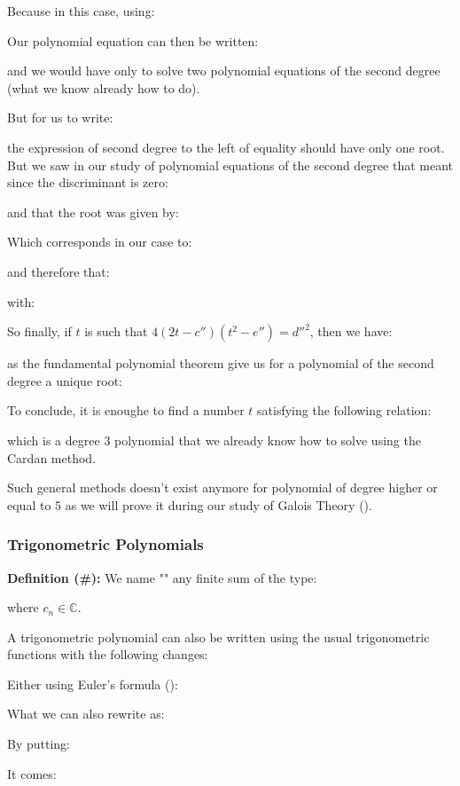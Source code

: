 	Because in this case, using:
	
	Our polynomial equation can then be written:
	
	and we would have only to solve two polynomial equations of the second degree (what we know already how to do).
	
	But for us to write:
	
	the expression of second degree to the left of equality should have only one root. But we saw in our study of polynomial equations of the second degree that meant since the discriminant is zero:
	
	and that the root was given by:
	
	Which corresponds in our case to:
	
	and therefore that:
	
	with:
	
	So finally, if $t$ is such that $4(2t-c'')(t^2-e'')={d''}^2$, then we have:
	
	as the fundamental polynomial theorem give us for a polynomial of the second degree a unique root:
	
	To conclude, it is enoughe to find a number $t$ satisfying the following relation:
	
	which is a degree $3$ polynomial that we already know how to solve using the Cardan method.

	Such general methods doesn't exist anymore for polynomial of degree higher or equal to $5$ as we will prove it during our study of Galois Theory ().
	
	\subsubsection{Trigonometric Polynomials}\label{trigonometric polynomials}
	\textbf{Definition (\#\mydef):} We name "" any finite sum of the type:
	
	where $c_n\in \mathbb{C}$.

	A trigonometric polynomial can also be written using the usual trigonometric functions with the following changes:
	
	Either using Euler's formula ():
	
	What we can also rewrite as:
	
	By putting:
	
	It comes:
	
